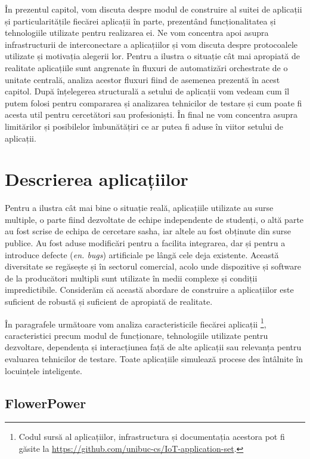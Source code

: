 În prezentul capitol, vom discuta despre modul de construire al suitei de aplicații și particularitățile fiecărei aplicații în parte, prezentând funcționalitatea și tehnologiile utilizate pentru realizarea ei. Ne vom concentra apoi asupra infrastructurii de interconectare a aplicațiilor și vom discuta despre protocoalele utilizate și motivația alegerii lor. Pentru a ilustra o situație cât mai apropiată de realitate aplicațiile sunt angrenate în fluxuri de automatizări orchestrate de o unitate centrală, analiza acestor fluxuri fiind de asemenea prezentă în acest capitol. După înțelegerea structurală a setului de aplicații vom vedeam cum îl putem folosi pentru compararea și analizarea tehnicilor de testare și cum poate fi acesta util pentru cercetători sau profesioniști. În final ne vom concentra asupra limitărilor și posibilelor îmbunătățiri ce ar putea fi aduse în viitor setului de aplicații.

\section{Descrierea aplicațiilor}

Pentru a ilustra cât mai bine o situație reală, aplicațiile utilizate au surse multiple, o parte fiind dezvoltate de echipe independente de studenți, o altă parte au fost scrise de echipa de cercetare \acrshort{sasha}, iar altele au fost obținute din surse publice. Au fost aduse modificări pentru a facilita integrarea, dar și pentru a introduce defecte (\textit{en. bugs}) artificiale pe lângă cele deja existente. Această diversitate se regăsește și în sectorul comercial, acolo unde dispozitive și software de la producători multipli sunt utilizate în medii complexe și condiții impredictibile. Considerăm că această abordare de construire a aplicațiilor este suficient de robustă și suficient de apropiată de realitate.

În paragrafele următoare vom analiza caracteristicile fiecărei aplicații \footnote{Codul sursă al aplicațiilor, infrastructura și documentația acestora pot fi găsite la \url{https://github.com/unibuc-cs/IoT-application-set}.}, caracteristici precum modul de funcționare, tehnologiile utilizate pentru dezvoltare, dependența și interacțiunea față de alte aplicații sau relevanța pentru evaluarea tehnicilor de testare. Toate aplicațiile simulează procese des întâlnite în locuințele inteligente.

\subsection*{FlowerPower}

